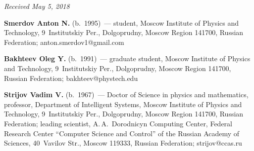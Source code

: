 \hfill{\small\textit{Received May 5, 2018}}


\vspace*{-18pt}


\Contr

\noindent
\textbf{Smerdov Anton N.} (b.\ 1995)~--- student, 
Moscow Institute of Physics and Technology, 
9~Institutskiy Per., Dolgoprudny, Moscow Region 141700, Russian Federation;  
\mbox{anton.smerdov1@gmail.com}

\vspace*{6pt}


\noindent
\textbf{Bakhteev Oleg Y.} (b.\ 1991)~--- 
graduate student, Moscow Institute of Physics 
and Technology, 9~Institutskiy Per., Dolgoprudny, Moscow Region 141700, Russian Federation; 
\mbox{bakhteev@phystech.edu}

\vspace*{6pt}

\noindent
\textbf{Strijov Vadim V.} (b.\ 1967)~--- 
Doctor of Science in physics and mathematics, professor,
Department of Intelligent Systems,
Moscow Institute of Physics 
and Technology, 9~Institutskiy Per., Dolgoprudny, Moscow Region 141700, Russian Federation; 
leading scientist, A.\,A.~Dorodnicyn Computing Center, 
Federal Research Center ``Computer Science and Control'' of the Russian Academy 
of Sciences, 40~Vavilov Str., Moscow 119333, Russian Federation; 
\mbox{strijov@ccas.ru}
\label{end\stat}

\renewcommand{\bibname}{\protect\rm Литература}       